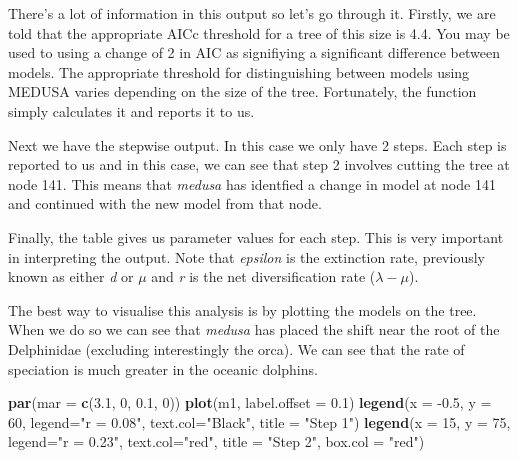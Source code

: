 \documentclass[
]{book}
\newenvironment{Shaded}{\begin{snugshade}}{\end{snugshade}}
\newcommand{\DataTypeTok}[1]{\textcolor[rgb]{0.13,0.29,0.53}{#1}}
\newcommand{\DecValTok}[1]{\textcolor[rgb]{0.00,0.00,0.81}{#1}}
\newcommand{\FloatTok}[1]{\textcolor[rgb]{0.00,0.00,0.81}{#1}}
\newcommand{\KeywordTok}[1]{\textcolor[rgb]{0.13,0.29,0.53}{\textbf{#1}}}
\newcommand{\NormalTok}[1]{#1}
\newcommand{\StringTok}[1]{\textcolor[rgb]{0.31,0.60,0.02}{#1}}
\begin{document}
There's a lot of information in this output so let's go through it. Firstly, we are told that the appropriate AICc threshold for a tree of this size is 4.4. You may be used to using a change of 2 in AIC as signifiying a significant difference between models. The appropriate threshold for distinguishing between models using MEDUSA varies depending on the size of the tree. Fortunately, the function simply calculates it and reports it to us.

Next we have the stepwise output. In this case we only have 2 steps. Each step is reported to us and in this case, we can see that step 2 involves cutting the tree at node 141. This means that \emph{medusa} has identfied a change in model at node 141 and continued with the new model from that node.

Finally, the table gives us parameter values for each step. This is very important in interpreting the output. Note that \emph{epsilon} is the extinction rate, previously known as either \emph{d} or \(\mu\) and \emph{r} is the net diversification rate (\(\lambda - \mu\)).

The best way to visualise this analysis is by plotting the models on the tree. When we do so we can see that \emph{medusa} has placed the shift near the root of the Delphinidae (excluding interestingly the orca). We can see that the rate of speciation is much greater in the oceanic dolphins.

\begin{Shaded}
\begin{Highlighting}[]
\KeywordTok{par}\NormalTok{(}\DataTypeTok{mar =} \KeywordTok{c}\NormalTok{(}\FloatTok{3.1}\NormalTok{, }\DecValTok{0}\NormalTok{, }\FloatTok{0.1}\NormalTok{, }\DecValTok{0}\NormalTok{))}
\KeywordTok{plot}\NormalTok{(m1, }\DataTypeTok{label.offset =} \FloatTok{0.1}\NormalTok{)}
\KeywordTok{legend}\NormalTok{(}\DataTypeTok{x =} \FloatTok{{-}0.5}\NormalTok{, }\DataTypeTok{y =} \DecValTok{60}\NormalTok{, }\DataTypeTok{legend=}\StringTok{"r = 0.08"}\NormalTok{,}
       \DataTypeTok{text.col=}\StringTok{"Black"}\NormalTok{, }\DataTypeTok{title =} \StringTok{"Step 1"}\NormalTok{)}
\KeywordTok{legend}\NormalTok{(}\DataTypeTok{x =} \DecValTok{15}\NormalTok{, }\DataTypeTok{y =} \DecValTok{75}\NormalTok{, }\DataTypeTok{legend=}\StringTok{"r = 0.23"}\NormalTok{,}
       \DataTypeTok{text.col=}\StringTok{"red"}\NormalTok{, }\DataTypeTok{title =} \StringTok{"Step 2"}\NormalTok{, }\DataTypeTok{box.col =} \StringTok{"red"}\NormalTok{)}
\end{Highlighting}
\end{Shaded}
\end{document}
